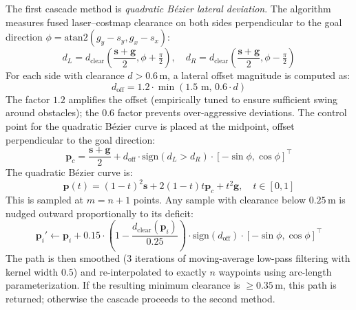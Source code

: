 \documentclass[lettersize,journal]{IEEEtran}
\begin{document}
The first cascade method is \textit{quadratic Bézier lateral deviation}. The 
algorithm measures fused laser--costmap clearance on both sides perpendicular 
to the goal direction $\phi = \text{atan2}(g_y - s_y, g_x - s_x)$:
\begin{equation}
  d_L = d_{\mathrm{clear}}\!\left(\frac{\mathbf{s}+\mathbf{g}}{2},
                                 \phi + \tfrac{\pi}{2}\right), \quad
  d_R = d_{\mathrm{clear}}\!\left(\frac{\mathbf{s}+\mathbf{g}}{2},
                                 \phi - \tfrac{\pi}{2}\right)
  \label{eq:side_clearance}
\end{equation}
For each side with clearance $d > 0.6$\,m, a lateral offset magnitude is 
computed as:
\begin{equation}
  d_{\mathrm{off}} = 1.2 \cdot \min(1.5\text{ m}, \, 0.6 \cdot d)
  \label{eq:offset_magnitude}
\end{equation}
The factor $1.2$ amplifies the offset (empirically tuned to ensure sufficient 
swing around obstacles); the $0.6$ factor prevents over-aggressive deviations. 
The control point for the quadratic Bézier curve is placed at the midpoint, 
offset perpendicular to the goal direction:
\begin{equation}
  \mathbf{p}_c = \frac{\mathbf{s}+\mathbf{g}}{2} + d_{\mathrm{off}} \cdot
                 \text{sign}(d_L > d_R) \cdot [-\sin\phi, \cos\phi]^\top
  \label{eq:control_point_bezier}
\end{equation}
The quadratic Bézier curve is:
\begin{equation}
  \mathbf{p}(t) = (1-t)^2 \mathbf{s} + 2(1-t)t \mathbf{p}_c + t^2 \mathbf{g},
  \quad t \in [0, 1]
  \label{eq:quadratic_bezier}
\end{equation}
This is sampled at $m = n + 1$ points. Any sample with clearance below 
$0.25$\,m is nudged outward proportionally to its deficit:
\begin{equation}
  \mathbf{p}_i' \leftarrow \mathbf{p}_i + 0.15 \cdot
  \left(1 - \frac{d_{\mathrm{clear}}(\mathbf{p}_i)}{0.25}\right) \cdot
  \text{sign}(d_{\mathrm{off}}) \cdot [-\sin\phi, \cos\phi]^\top
  \label{eq:waypoint_nudge}
\end{equation}
The path is then smoothed (3 iterations of moving-average low-pass filtering 
with kernel width $0.5$) and re-interpolated to exactly $n$ waypoints using 
arc-length parameterization. If the resulting minimum clearance is 
$\geq 0.35$\,m, this path is returned; otherwise the cascade proceeds to the 
second method.
\end{document}
